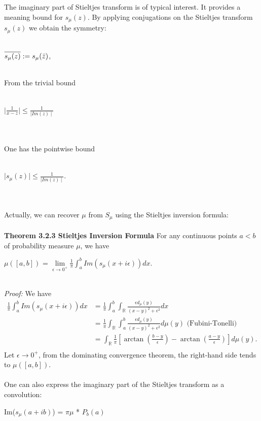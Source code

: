 \documentclass{article}
\begin{document}
\noindent The imaginary part of Stieltjes transform is of typical interest. It provides a meaning bound for $s_\mu (z)$. By applying conjugations on the Stieltjes transform $s_{\mu}(z)$ we obtain the symmetry: \\
\\
\centerline{$\overline{s_{\mu}(z)}:= s_{\mu}(\Bar{z})$,}
\\
From the trivial bound \\
\\
\centerline{$\mid \frac{1}{x - z} \mid \leq \frac{1}{\mid Im(z) \mid}$}
\\
\\
One has the pointwise bound\\
\\
\centerline{$\mid s_{\mu}(z) \mid \leq \frac{1}{\mid Im(z) \mid}.$}
\\
\\
Actually, we can recover $\mu$ from $S_{\mu}$ using the Stieltjes inversion formula:
\\ \\
\textbf{Theorem 3.2.3 Stieltjes Inversion Formula} For any continuous points $a < b$ of probability measure $\mu$, we have \\
\centerline{$\mu ([a,b])$ = $\lim\limits_{\epsilon \rightarrow 0^+} \frac{1}{\pi} \int_{a}^b Im(s_\mu (x + i \epsilon)) dx.$}
\\
\textit{Proof:} We have
\begin{align*}
    \frac{1}{\pi} \int_a^b Im(s_{\mu} (x + i \epsilon)) dx 
    &= \frac{1}{\pi} \int_a^b \int_{\mathbb{R}} \frac{\epsilon d_{\mu}(y)}{(x - y)^2 + \epsilon^2}dx \\
    &= \frac{1}{\pi} \int_{\mathbb{R}} \int_a^b \frac{\epsilon d_{\mu}(y)}{(x - y)^2 + \epsilon^2}d\mu (y) \text{    (Fubini-Tonelli)}\\
    &= \int_{\mathbb{R}} \frac{1}{\pi} \left[\arctan \left (\frac{b - y}{\epsilon}\right) - \arctan \left (\frac{a - y}{\epsilon} \right)\right]d\mu(y).\\
\end{align*}
Let $\epsilon \rightarrow 0^+$, from the dominating convergence theorem, the right-hand side tends to $\mu([a, b])$.
\\
\\
One can also express the imaginary part of the Stieltjes transform as a convolution:\\
\centerline{Im($s_\mu (a + ib)$) = $\pi \mu$ * $P_b(a)$}
\\
\\
\end{document}
